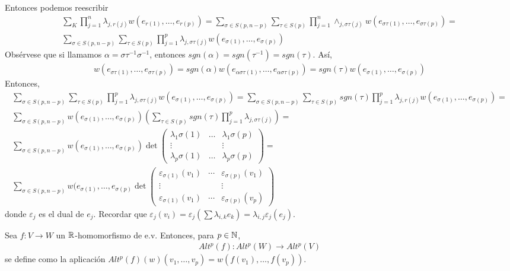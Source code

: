 \documentclass[CV.tex]{subfiles}
\begin{document}
\begin{dem}
Entonces podemos reescribir
\begin{gather*}
\sum_K\prod_{j=1}^n\lambda_{j,r(j)}w(e_{r(1)},\dots, e_{r(p)})=\sum_{\sigma\in S(p,n-p)}\sum_{\tau\in S(p)}\prod_{j=1}^n\land_{j,\sigma\tau(j)}w(e_{\sigma\tau(1)},\dots, e_{\sigma\tau(p)})=\\
\sum_{\sigma\in S(p,n-p)}\sum_{\tau\in S(p)}\prod_{j=1}^p\lambda_{j,\sigma\tau(j)}w(e_{\sigma(1)},\dots, e_{\sigma(p)})
\end{gather*}
Obsérvese que si llamamos $\alpha=\sigma\tau^{-1}\sigma^{-1}$, entonces $sgn(\alpha)=sgn(\tau^{-1})=sgn(\tau)$. Así, 
\begin{gather*}
w(e_{\sigma\tau(1)},\dots, e_{\sigma\tau(p)})=sgn(\alpha)w(e_{\alpha\sigma\tau(1)},\dots, e_{\alpha\sigma\tau(p)})=sgn(\tau)w(e_{\sigma(1)},\dots,e_{\sigma(p)})
\end{gather*}
Entonces,
\begin{gather*}
\sum_{\sigma\in S(p,n-p)}\sum_{\tau\in S(p)}\prod_{j=1}^p\lambda_{j,\sigma\tau(j)}w(e_{\sigma(1)},\dots, e_{\sigma(p)})=\sum_{\sigma\in S(p,n-p)}\sum_{\tau
\in S(p)}sgn(\tau)\prod_{j=1}^p\lambda_{j,r(j)}w(e_{\sigma(1)},\dots, e_{\sigma(p)})=\\
\sum_{\sigma\in S(p,n-p)}w(e_{\sigma(1)},\dots, e_{\sigma(p)})\left(\sum_{\tau\in S(p)}sgn(\tau)\prod_{j=1}^p\lambda_{j,\sigma\tau(j)}\right)=\\
\sum_{\sigma\in S(p,n-p)}w(e_{\sigma(1)},\dots, e_{\sigma(p)})\det\begin{pmatrix}
\lambda_1\sigma(1) & \dots & \lambda_1\sigma(p)\\
\vdots & & \vdots\\
\lambda_p\sigma(1) & \dots & \lambda_p\sigma(p)
\end{pmatrix}=\\
\sum_{\sigma\in S(p,n-p)}w(e_{\sigma(1)},\dots, e_{\sigma(p)}\det\begin{pmatrix}
\varepsilon_{\sigma(1)}(v_1) & \cdots & \varepsilon_{\sigma(p)}(v_1)\\
\vdots & & \vdots\\
\varepsilon_{\sigma(1)}(v_1) & \cdots & \varepsilon_{\sigma(p)}(v_p)
\end{pmatrix}
\end{gather*}
donde $\varepsilon_j$ es el dual de $e_j$. Recordar que $\varepsilon_j(v_i)=\varepsilon_j(\sum\lambda_{i,k}e_k)=\lambda_{i,j}\varepsilon_j(e_j)$.

Sea $f:V\to W$ un $\mathbb{R}$-homomorfismo de e.v. Entonces, para $p\in\mathbb{N}$, 
\begin{align*}
Alt^p(f): Alt^p(W)\to Alt^p(V)
\end{align*}
se define como la aplicación $Alt^p(f)(w)(v_1,\dots, v_p)=w(f(v_1),\dots, f(v_p))$.


\end{dem}
\end{document}
